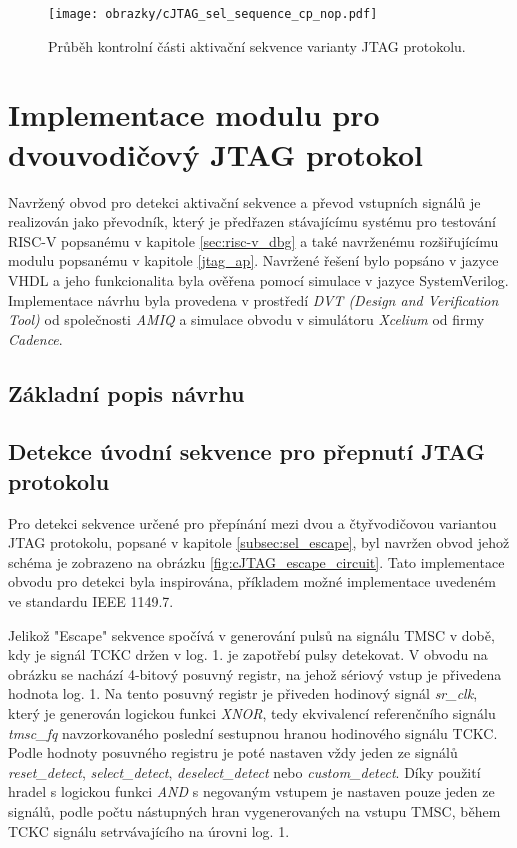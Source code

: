 \begin{figure}[!h]
  \begin{center}
    \texttt{[image: obrazky/cJTAG\_sel\_sequence\_cp\_nop.pdf]}
  \end{center}
  \caption{Průběh kontrolní části aktivační sekvence varianty \acs{JTAG} protokolu.}
	\label{fig:cJTAG_sel_cp_nop}
\end{figure}

\section{Implementace modulu pro dvouvodičový JTAG protokol}
Navržený obvod pro detekci aktivační sekvence a převod vstupních signálů je realizován jako převodník, který je předřazen stávajícímu systému pro testování \acs{RISC-V} popsanému v kapitole \ref{sec:risc-v_dbg} a také navrženému rozšiřujícímu modulu popsanému v kapitole \ref{jtag_ap}. Navržené řešení bylo popsáno v jazyce \acs{VHDL} a jeho funkcionalita byla ověřena pomocí simulace v jazyce SystemVerilog. Implementace návrhu byla provedena v prostředí \textit{DVT (Design and Verification Tool)} od společnosti \textit{AMIQ} a simulace obvodu v simulátoru \textit{Xcelium} od firmy \textit{Cadence}.

\subsection{Základní popis návrhu}	\label{subsec:cJTAG_adapter}


\subsection{Detekce úvodní sekvence pro přepnutí JTAG protokolu}	\label{subsec:sel_escape_det}
Pro detekci sekvence určené pro přepínání mezi dvou a čtyřvodičovou variantou \acs{JTAG} protokolu, popsané v kapitole \ref{subsec:sel_escape}, byl navržen obvod jehož schéma je zobrazeno na obrázku \ref{fig:cJTAG_escape_circuit}. Tato implementace obvodu pro detekci byla inspirována, příkladem možné implementace uvedeném ve standardu IEEE 1149.7.

Jelikož "Escape" sekvence spočívá v generování pulsů na signálu TMSC v době, kdy je signál TCKC držen v log. 1. je zapotřebí pulsy detekovat. V obvodu na obrázku se nachází 4-bitový posuvný registr, na jehož sériový vstup je přivedena hodnota log. 1. Na tento posuvný registr je přiveden hodinový signál \textit{sr\_clk}, který je generován logickou funkci \textit{XNOR}, tedy ekvivalencí referenčního signálu \textit{tmsc\_fq} navzorkovaného poslední sestupnou hranou hodinového signálu TCKC. Podle hodnoty posuvného registru je poté nastaven vždy jeden ze signálů \textit{reset\_detect}, \textit{select\_detect}, \textit{deselect\_detect} nebo \textit{custom\_detect}. Díky použití hradel s logickou funkci \textit{AND} s negovaným vstupem je nastaven pouze jeden ze signálů, podle počtu nástupných hran vygenerovaných na vstupu TMSC, během TCKC signálu setrvávajícího na úrovni log. 1. 

